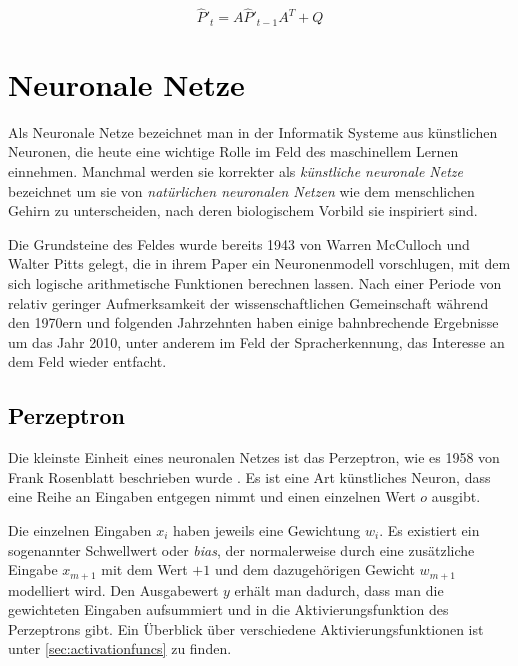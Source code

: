 \begin{equation}
	\hat{P}'_t = A \hat{P}'_{t-1} A^\textit{T} + Q
\end{equation}





\section{\textcolor{black}{Neuronale Netze}}

Als Neuronale Netze  %
bezeichnet man in der Informatik Systeme aus künstlichen Neuronen, die heute eine wichtige Rolle im Feld des maschinellem Lernen einnehmen.
Manchmal werden sie korrekter als \textit{künstliche neuronale Netze} bezeichnet um sie von \textit{natürlichen neuronalen Netzen} 
wie dem menschlichen Gehirn zu unterscheiden, nach deren biologischem Vorbild sie inspiriert sind.

Die Grundsteine des Feldes wurde bereits 1943 von Warren McCulloch und Walter Pitts gelegt, 
die in ihrem Paper \cite{mcculloch1943logical} ein Neuronenmodell vorschlugen, mit dem sich logische arithmetische Funktionen berechnen lassen. 
Nach einer Periode von relativ geringer Aufmerksamkeit der wissenschaftlichen Gemeinschaft während den 1970ern und folgenden Jahrzehnten 
haben einige bahnbrechende Ergebnisse um das Jahr 2010, unter anderem im Feld der Spracherkennung, das Interesse an dem Feld wieder entfacht. 



\subsection{\textcolor{black}{Perzeptron}}
Die kleinste Einheit eines neuronalen Netzes ist das Perzeptron, wie es 1958 von Frank Rosenblatt beschrieben wurde \cite{rosenblatt1958perceptron}.
Es ist eine Art künstliches Neuron, dass eine Reihe an Eingaben entgegen nimmt und einen einzelnen Wert \(o\) ausgibt.


Die einzelnen Eingaben \(x_i\) haben jeweils eine Gewichtung \(w_i\).
Es existiert ein sogenannter Schwellwert oder \textit{bias}, der normalerweise 
durch eine zusätzliche Eingabe \(x_{m+1}\) mit dem Wert \(+1\) und dem dazugehörigen Gewicht \(w_{m+1}\) modelliert wird.
Den Ausgabewert \(y\) erhält man dadurch, dass man die gewichteten Eingaben aufsummiert und in die Aktivierungsfunktion des Perzeptrons gibt.
Ein Überblick über verschiedene Aktivierungsfunktionen ist unter \ref{sec:activationfuncs} zu finden.

